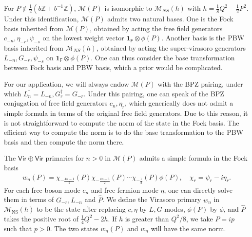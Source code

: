 \documentclass[12pt]{article}
\newcommand{\ie}{\begin{equation}\begin{aligned}}
\newcommand{\fe}{\end{aligned}\end{equation}}
\numberwithin{equation}{section}
\newcommand{\NS}{\mathrm{NS}}
\begin{document}
For $P\notin \frac{1}{2}(b\mathbb{Z}+b^{-1}\mathbb{Z})$, $\mathcal{M}(P)$ is isomorphic to $\mathcal{M}_{NS}(h)$ with $h = \frac{1}{8}Q^2-\frac{1}{2}P^2$. Under this identification, \(\mathcal{M}(P)\) admits two natural
bases. One is the Fock basis inherited from $\mathcal{M}(P)$, obtained by acting the free field generators $c_{-n}, \eta_{-r} ,\psi_{-s}$ on the lowest weight vector $\mathbf{1}_{\mathsf{F}}\otimes \phi(P)$. Another basis is the PBW basis inherited from $\mathcal{M}_{NS}(h)$, obtained by acting the super-virasoro generators $L_{-n}, G_{-r} ,\psi_{-s}$ on $\mathbf{1}_{\mathsf{F}}\otimes \phi(P)$. One can thus consider the base transformation between Fock basis and PBW basis, which a prior would be complicated.

For our application, we will always endow $\mathcal{M}(P)$ with the BPZ pairing, under which $L_n^\dagger = L_{-n}, G_{r}^\dagger = G_{-r}$. Under this pairing, one can speak of the BPZ conjugation of free field generators $c_n,\eta_r$, which generically does not admit a simple formula in terms of the original free field generators. Due to this reason, it is not straightforward to compute  the norm of the state in the Fock basis. The efficient way to compute the norm is to do the base transformation to the PBW basis and then compute the norm there.

The $\mathsf{Vir}\oplus\mathsf{Vir}$ primaries for $n>0$ in $\mathcal{M}(P)$ admits a simple formula in the Fock basis
\ie
w_n(P)=\chi_{-\frac{4n-1}{2}}(P)\chi_{-\frac{4n-3}{2}}(P)\cdots \chi_{-\frac{1}{2}}(P)\phi(P),\quad \chi_{r} = \psi_r - i\eta_r.
\fe
For each free boson mode $c_n$ and free fermion mode $\eta$, one can directly solve them in terms of $G_{-r}, L_{-n}$ and $\hat{P}$. We define the Virasoro primary $w_n$ in $\mathcal{M}_{\NS}(h)$ to be the state after replacing $c, \eta$ by $L, G$ modes, $\phi(P)$ by $\phi$, and $\hat{P}$ takes the positive root of $\frac{1}{4}Q^2-2h$. If $h$ is greater than $Q^2/8$, we take $P=ip$ such that $p>0$. The two states $w_n(P)$ and $w_n$ will have the same norm.
\end{document}
